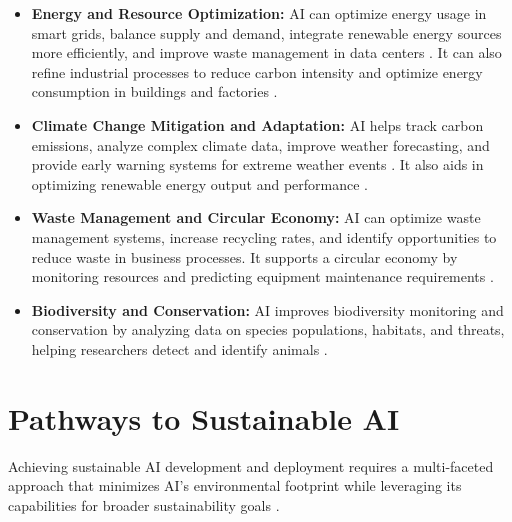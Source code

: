 \begin{itemize}
    \item \textbf{Energy and Resource Optimization:} AI can optimize energy usage in smart grids, balance supply and demand, integrate renewable energy sources more efficiently, and improve waste management in data centers \parencite{Intel2023}. It can also refine industrial processes to reduce carbon intensity and optimize energy consumption in buildings and factories \parencite{Artefact2023}.
    \item \textbf{Climate Change Mitigation and Adaptation:} AI helps track carbon emissions, analyze complex climate data, improve weather forecasting, and provide early warning systems for extreme weather events \parencite{AIMultiple2023}. It also aids in optimizing renewable energy output and performance \parencite{RipiKAI2023}.
    \item \textbf{Waste Management and Circular Economy:} AI can optimize waste management systems, increase recycling rates, and identify opportunities to reduce waste in business processes. It supports a circular economy by monitoring resources and predicting equipment maintenance requirements \parencite{Fang2023}.
    \item \textbf{Biodiversity and Conservation:} AI improves biodiversity monitoring and conservation by analyzing data on species populations, habitats, and threats, helping researchers detect and identify animals \parencite{WEForum2023}.
\end{itemize}

\section{Pathways to Sustainable AI}
\label{sec:sustainable_ai_pathways}
Achieving sustainable AI development and deployment requires a multi-faceted approach that minimizes AI's environmental footprint while leveraging its capabilities for broader sustainability goals \parencite{SopraSteria2025}.

